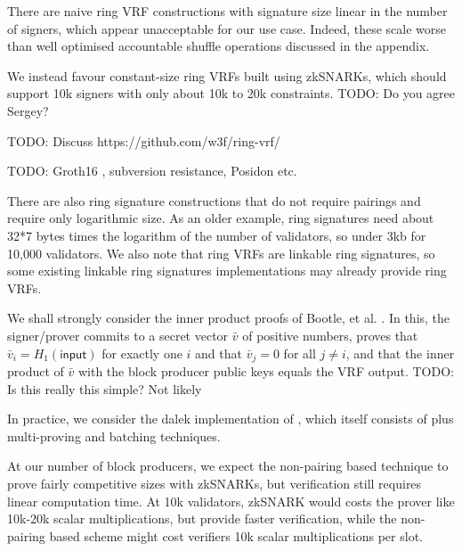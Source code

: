 There are naive ring VRF constructions with signature size linear in the number of signers, which appear unacceptable for our use case.  Indeed, these scale worse than well optimised accountable shuffle operations discussed in the appendix.


We instead favour constant-size ring VRFs built using zkSNARKs, which should support 10k signers with only about 10k to 20k constraints.  TODO: Do you agree Sergey?

TODO:  Discuss https://github.com/w3f/ring-vrf/

TODO:  Groth16 \cite{Groth16}, subversion resistance, Posidon etc.

There are also ring signature constructions that do not require pairings and require only logarithmic size.  As an older example, ring signatures \cite{GK2015} need about 32*7 bytes times the logarithm of the number of validators, so under 3kb for 10,000 validators.  We also note that ring VRFs are linkable ring signatures, so some existing linkable ring signatures implementations may already provide ring VRFs.


We shall strongly consider the inner product proofs of Bootle, et al. \cite{bccgp2016}.  In this, the signer/prover commits to a secret vector $\bar{v}$ of positive numbers, proves that $\bar{v}_i = H_1(\mathsf{input})$ for exactly one $i$ and that $\bar{v}_j = 0$ for all $j \ne i$, and that the inner product of $\bar{v}$ with the block producer public keys equals the VRF output.  TODO:  Is this really this simple?  Not likely

In practice, we consider the dalek implementation \cite{dalek_bulletproofs} of \cite{bulletproofs}, which itself consists of \cite{bccgp2016} plus multi-proving and batching techniques.

At our number of block producers, we expect the non-pairing based technique to prove fairly competitive sizes with zkSNARKs, but verification still requires linear computation time.  At 10k validators, zkSNARK would costs the prover like 10k-20k scalar multiplications, but provide faster verification, while the non-pairing based scheme might cost verifiers 10k scalar multiplications per slot.  


